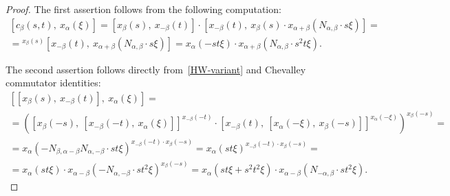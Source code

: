 \documentclass[oneside, 8pt]{amsart}
\theoremstyle{remark}
\theoremstyle{definition}
\numberwithin{lemma}{section}
\numberwithin{prop}{section}
\numberwithin{corollary}{section}
\numberwithin{externaltheorem}{section}
\numberwithin{equation}{section}
\begin{document}
\begin{proof}
The first assertion follows from the following computation:
\begin{multline} \nonumber [c_{\beta}(s, t),\ x_{\alpha}(\xi)]  = [x_{\beta}(s),\ x_{-\beta}(t)] \cdot [x_{-\beta}(t),\ x_{\beta}(s)\cdot x_{\alpha + \beta}(N_{\alpha, \beta} \cdot s\xi)] = \\
 = {}^{x_\beta(s)}\![x_{-\beta}(t),\ x_{\alpha+\beta}(N_{\alpha, \beta} \cdot s\xi)] = x_{\alpha}(- st\xi) \cdot x_{\alpha+\beta}(N_{\alpha,\beta} \cdot s^2t\xi). \end{multline}
 
The second assertion follows directly from~\eqref{HW-variant} and Chevalley commutator identities:
\begin{multline} \nonumber
[[x_\beta(s),\ x_{-\beta}(t)],\ x_{\alpha}(\xi)] = \\
= \left([x_\beta(-s),\ [x_{-\beta}(-t),\ x_{\alpha}(\xi)]] ^ {x_{-\beta}(-t)} \cdot [x_{-\beta}(t),\ [ x_{\alpha}(-\xi),\ x_\beta(-s)]] ^ {x_{\alpha}(-\xi)}\right)^{x_\beta(-s)} = \\
= x_{\alpha}(-N_{\beta, \alpha-\beta} N_{\alpha,-\beta} \cdot s t \xi) ^ {x_{-\beta}(-t) \cdot x_\beta(-s)} = x_{\alpha}(s t \xi) ^ {x_{-\beta}(-t) \cdot x_\beta(-s)} = \\
= x_{\alpha}(st\xi) \cdot x_{\alpha-\beta}(-N_{\alpha,-\beta}\cdot st^2\xi)^{x_\beta(-s)} = x_{\alpha}(st\xi + s^2t^2 \xi) \cdot x_{\alpha-\beta}(N_{-\alpha,\beta}\cdot st^2\xi). \end{multline}


\end{proof}
\end{document}
